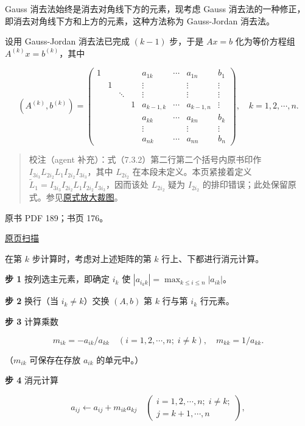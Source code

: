 \documentclass[
  10pt,
  fontset=fandol]{ctexart}
\begin{document}
Gauss 消去法始终是消去对角线下方的元素，现考虑 Gauss 消去法的一种修正，即消去对角线下方和上方的元素，这种方法称为 Gauss-Jordan 消去法。

设用 Gauss-Jordan 消去法已完成 \((k-1)\) 步，于是 \(Ax=b\) 化为等价方程组 \(A^{(k)}x=b^{(k)}\)，其中

\[
(A^{(k)},b^{(k)})=\left(\begin{array}{ccccccc|c}
1&&&&a_{1k}&\cdots&a_{1n}&b_1\\
&1&&&\vdots&&\vdots&\vdots\\
&&\ddots&&\vdots&&\vdots&\vdots\\
&&&1&a_{k-1,k}&\cdots&a_{k-1,n}&\vdots\\
&&&&a_{kk}&\cdots&a_{kn}&b_k\\
&&&&\vdots&&\vdots&\vdots\\
&&&&a_{nk}&\cdots&a_{nn}&b_n
\end{array}\right),\quad k=1,2,\cdots,n.
\]

\begin{quote}
校注（agent 补充）：式（7.3.2）第二行第二个括号内原书印作 \(I_{3i_3}L_{2i_2}L_1I_{2i_2}I_{3i_3}\)，其中 \(L_{2i_2}\) 在本段未定义。本页紧接着定义 \(\widetilde{L}_1=I_{3i_3}I_{2i_2}L_1I_{2i_2}I_{3i_3}\)，因而该处 \(L_{2i_2}\) 疑为 \(I_{2i_2}\) 的排印错误；此处保留原式。参见\href{../../../staging/ch07a/assets/pdf-188-permutation-detail.png}{原式放大裁图}。
\end{quote}

\clearpage

原书 PDF 189；书页 176。

\href{../../../source-images/pdf-189.jpeg}{原页扫描}

在第 \(k\) 步计算时，考虑对上述矩阵的第 \(k\) 行上、下都进行消元计算。

\textbf{步 1} 按列选主元素，即确定 \(i_k\) 使 \(|a_{i_kk}|=\max_{k\le i\le n}|a_{ik}|\)。

\textbf{步 2} 换行（当 \(i_k\ne k\)）交换 \((A,b)\) 第 \(k\) 行与第 \(i_k\) 行元素。

\textbf{步 3} 计算乘数

\[m_{ik}=-a_{ik}/a_{kk}\quad(i=1,2,\cdots,n;\;i\ne k),\quad m_{kk}=1/a_{kk}.\]

（\(m_{ik}\) 可保存在存放 \(a_{ik}\) 的单元中。）

\textbf{步 4} 消元计算

\[a_{ij}\leftarrow a_{ij}+m_{ik}a_{kj}\quad
\left(\begin{array}{l}i=1,2,\cdots,n;\;i\ne k;\\j=k+1,\cdots,n\end{array}\right),\]
\end{document}
